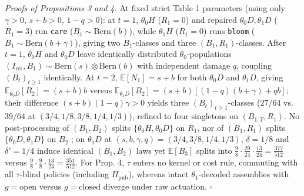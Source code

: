\documentclass[12pt,letterpaper]{article}
\begin{document}
\emph{Proofs of Propositions 3 and 4.} At fixed strict Table 1
parameters (using only \(\gamma > 0\), \(s+b > 0\), \(1-q > 0\)): at
\(t=1\), \(\theta_0 H\) (\(R_1=0\)) and repaired
\(\theta_0 D, \theta_1 D\) (\(R_1=3\)) run \texttt{care}
(\(B_1 \sim \mathrm{Bern}(b)\)), while \(\theta_1 H\) (\(R_1=0\)) runs
\texttt{bloom} (\(B_1 \sim \mathrm{Bern}(b+\gamma)\)), giving two
\(B_1\)-classes and three \((B_1,R_1)\)-classes. After \(t=1\),
\(\theta_0 H\) and \(\theta_0 D\) leave identically distributed
\(\theta_0\)-populations
\((I_{\mathrm{ret}}, B_1) \sim \mathrm{Bern}(s)\otimes\mathrm{Bern}(b)\)
with independent damage \(q\), coupling \((B_t)_{t\ge 1}\) identically.
At \(t=2\), \(\mathbb{E}[N_1] = s+b\) for both \(\theta_0 D\) and
\(\theta_1 D\), giving \(\mathbb{E}_{\theta_0 D}[B_2] = (s+b)b\) versus
\(\mathbb{E}_{\theta_1 D}[B_2] = (s+b)[(1-q)(b+\gamma)+qb]\); their
difference \((s+b)(1-q)\gamma > 0\) yields three
\((B_t)_{t\ge 1}\)-classes (\(27/64\) vs.~\(39/64\) at
\((3/4,1/8,3/8,1/4,1/3)\)), refined to four singletons on
\((B_{1:T}, R_1)\). No post-processing of \((B_1,B_2)\) splits
\(\{\theta_0 H,\theta_0 D\}\) on \(R_1\), nor of \((B_1,R_1)\) splits
\(\{\theta_0 D,\theta_1 D\}\) on \(B_2\) \citep{blackwell1953}; on
\(\theta_1 D\) at \((s,b,\gamma,q)=(3/4,3/8,1/4,1/3)\), \(\delta=1/8\)
and \(\delta'=1/4\) induce identical \((B_1,B_2)\) laws yet
\(\mathbb{E}[B_3]\) splits into
\(\frac{9}{8}\cdot\frac{29}{24}\cdot\frac{13}{24}=\frac{377}{512}\)
versus
\(\frac{9}{8}\cdot\frac{9}{8}\cdot\frac{13}{24}=\frac{351}{512}\). For
Prop. 4, \(\tau\) enters no kernel or cost rule, commuting with all
\(\tau\)-blind policies (including \(\Pi_{\mathrm{pub}}\)), whereas
intact \(\theta_1\)-decoded assemblies with \(g=\mathrm{open}\) versus
\(g=\mathrm{closed}\) diverge under raw actuation. \(\square\)
\end{document}
